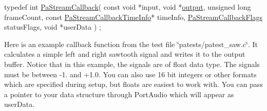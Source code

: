 \begin{DoxyCode}
\textcolor{keyword}{typedef} \textcolor{keywordtype}{int} \hyperlink{portaudio_8h_a8a60fb2a5ec9cbade3f54a9c978e2710}{PaStreamCallback}( \textcolor{keyword}{const} \textcolor{keywordtype}{void} *input,
                                      \textcolor{keywordtype}{void} *\hyperlink{namespacelv2specgen_a653e2b7722801dea4d25040ac958b631}{output},
                                      \textcolor{keywordtype}{unsigned} \textcolor{keywordtype}{long} frameCount,
                                      \textcolor{keyword}{const} \hyperlink{struct_pa_stream_callback_time_info}{PaStreamCallbackTimeInfo}* timeInfo,
                                      \hyperlink{portaudio_8h_a55a005924bcfa0424594f4f65cd4ae82}{PaStreamCallbackFlags} statusFlags,
                                      \textcolor{keywordtype}{void} *userData ) ;
\end{DoxyCode}
 Here is an example callback function from the test file \char`\"{}patests/patest\+\_\+saw.\+c\char`\"{}. It calculates a simple left and right sawtooth signal and writes it to the output buffer. Notice that in this example, the signals are of float data type. The signals must be between -\/1. and +1.0. You can also use 16 bit integers or other formats which are specified during setup, but floats are easiest to work with. You can pass a pointer to your data structure through Port\+Audio which will appear as user\+Data.


